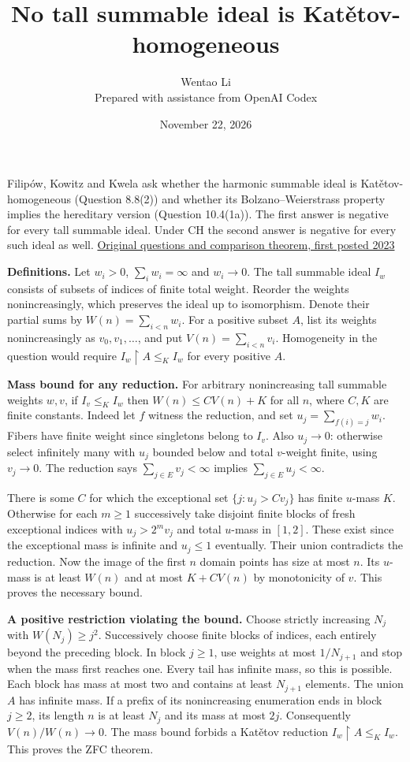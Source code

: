 \documentclass[11pt]{article}
\author{Wentao Li\\\small Prepared with assistance from OpenAI Codex}
\date{November 22, 2026}
\title{No tall summable ideal is Katětov-homogeneous}
\begin{document}
\maketitle
Filipów, Kowitz and Kwela ask whether the harmonic summable ideal is Katětov-homogeneous (Question 8.8(2)) and whether its Bolzano--Weierstrass property implies the hereditary version (Question 10.4(1a)). The first answer is negative for every tall summable ideal. Under CH the second answer is negative for every such ideal as well. \href{https://doi.org/10.1017/jsl.2024.8}{Original questions and comparison theorem, first posted 2023}

\textbf{Definitions.} Let \(w_i>0\), \(\sum_i w_i=\infty\) and \(w_i\to0\). The tall summable ideal \(I_w\) consists of subsets of indices of finite total weight. Reorder the weights nonincreasingly, which preserves the ideal up to isomorphism. Denote their partial sums by \(W(n)=\sum_{i<n}w_i\). For a positive subset \(A\), list its weights nonincreasingly as \(v_0,v_1,\ldots\), and put \(V(n)=\sum_{i<n}v_i\). Homogeneity in the question would require \(I_w\restriction A\le_K I_w\) for every positive \(A\).

\textbf{Mass bound for any reduction.} For arbitrary nonincreasing tall summable weights \(w,v\), if \(I_v\le_K I_w\) then \(W(n)\le C V(n)+K\) for all \(n\), where \(C,K\) are finite constants. Indeed let \(f\) witness the reduction, and set \(u_j=\sum_{f(i)=j}w_i\). Fibers have finite weight since singletons belong to \(I_v\). Also \(u_j\to0\): otherwise select infinitely many with \(u_j\) bounded below and total \(v\)-weight finite, using \(v_j\to0\). The reduction says \(\sum_{j\in E}v_j<\infty\) implies \(\sum_{j\in E}u_j<\infty\).

There is some \(C\) for which the exceptional set \(\{j:u_j>Cv_j\}\) has finite \(u\)-mass \(K\). Otherwise for each \(m\ge1\) successively take disjoint finite blocks of fresh exceptional indices with \(u_j>2^m v_j\) and total \(u\)-mass in \([1,2]\). These exist since the exceptional mass is infinite and \(u_j\le1\) eventually. Their union contradicts the reduction. Now the image of the first \(n\) domain points has size at most \(n\). Its \(u\)-mass is at least \(W(n)\) and at most \(K+C V(n)\) by monotonicity of \(v\). This proves the necessary bound.

\textbf{A positive restriction violating the bound.} Choose strictly increasing \(N_j\) with \(W(N_j)\ge j^2\). Successively choose finite blocks of indices, each entirely beyond the preceding block. In block \(j\ge1\), use weights at most \(1/N_{j+1}\) and stop when the mass first reaches one. Every tail has infinite mass, so this is possible. Each block has mass at most two and contains at least \(N_{j+1}\) elements. The union \(A\) has infinite mass. If a prefix of its nonincreasing enumeration ends in block \(j\ge2\), its length \(n\) is at least \(N_j\) and its mass at most \(2j\). Consequently \(V(n)/W(n)\to0\). The mass bound forbids a Katětov reduction \(I_w\restriction A\le_K I_w\). This proves the ZFC theorem.
\end{document}
